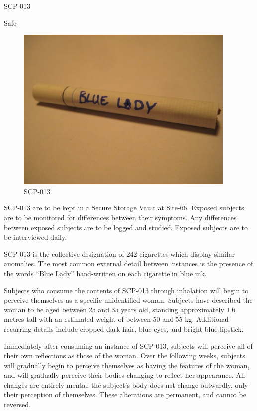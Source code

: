 
 SCP-013

 Safe

\begin{figure}[h]
\begin{center}
\includegraphics[scale=1.4]{scp/013.jpg}
\linebreak SCP-013
\end{center}
\end{figure}

 SCP-013 are to be kept in a Secure Storage Vault at Site-66. Exposed subjects are to be monitored for differences between their symptoms. Any differences between exposed subjects are to be logged and studied. Exposed subjects are to be interviewed daily.

 SCP-013 is the collective designation of 242 cigarettes which display similar anomalies. The most common external detail between instances is the presence of the words “Blue Lady” hand-written on each cigarette in blue ink.

Subjects who consume the contents of SCP-013 through inhalation will begin to perceive themselves as a specific unidentified woman. Subjects have described the woman to be aged between 25 and 35 years old, standing approximately 1.6 metres tall with an estimated weight of between 50 and 55 kg. Additional recurring details include cropped dark hair, blue eyes, and bright blue lipstick.

Immediately after consuming an instance of SCP-013, subjects will perceive all of their own reflections as those of the woman. Over the following weeks, subjects will gradually begin to perceive themselves as having the features of the woman, and will gradually perceive their bodies changing to reflect her appearance. All changes are entirely mental; the subject’s body does not change outwardly, only their perception of themselves. These alterations are permanent, and cannot be reversed.

